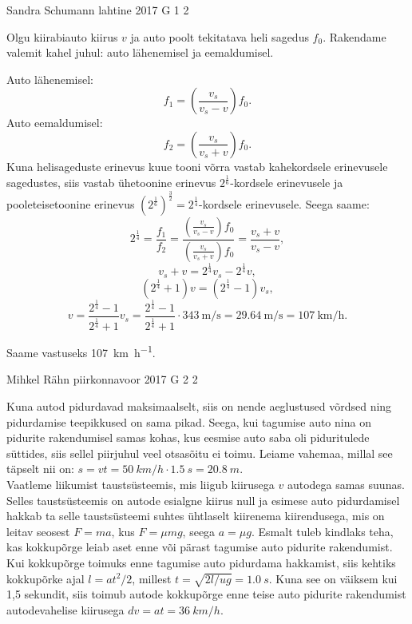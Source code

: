 \documentclass[11pt, twoside]{article}
\begin{document}
{%
{Sandra Schumann} %
{lahtine} %
{2017} %
{G 1} %
{2} %
{

\ifSolution
Olgu kiirabiauto kiirus $v$ ja auto poolt tekitatava heli sagedus $f_0$. Rakendame valemit kahel juhul: auto lähenemisel ja eemaldumisel.

Auto lähenemisel:
\[f_1 = \left(\frac{v_s}{v_s - v}\right)f_0.\]
Auto eemaldumisel:
\[f_2 = \left(\frac{v_s}{v_s + v}\right)f_0.\]
Kuna helisageduste erinevus kuue tooni võrra vastab kahekordsele erinevusele sagedustes, siis vastab ühetoonine erinevus $2^{\frac 1 6}$-kordsele erinevusele ja pooleteisetoonine erinevus $\left(2^{\frac 1 6}\right)^{\frac 3 2} = 2^{\frac 1 4}$-kordsele erinevusele. Seega saame:
\[2^{\frac 1 4} = \frac{f_1}{f_2} = \frac{(\frac{v_s}{v_s - v})f_0}{(\frac{v_s}{v_s + v})f_0} = \frac{v_s + v}{v_s - v},\]
\[v_s + v = 2^{\frac 1 4}v_s - 2^{\frac 1 4}v,\]
\[(2^{\frac 1 4} + 1)v = (2^{\frac 1 4} - 1)v_s,\]
\[v = \frac{2^{\frac 1 4} - 1}{2^{\frac 1 4} + 1}v_s = \frac{2^{\frac 1 4} - 1}{2^{\frac 1 4} + 1} \cdot \SI{343}{\meter\per\second} = \SI{29.64}{\meter\per\second} = \SI{107}{\kilo\meter\per\hour}. \]

Saame vastuseks \SI{107}{\kilo\meter\per\hour}.
\fi
}

{Mihkel Rähn} %
{piirkonnavoor} %
{2017} %
{G 2} %
{2} %
{

\ifSolution
\osa Kuna autod pidurdavad maksimaalselt, siis on nende aeglustused võrdsed ning pidurdamise teepikkused on sama pikad. Seega, kui tagumise auto nina on pidurite rakendumisel samas kohas, kus eesmise auto saba oli piduritulede süttides, siis sellel piirjuhul veel otsasõitu ei toimu. Leiame vahemaa, millal see täpselt nii on: $s=vt=\SI{50}{km/h}\cdot\SI{1,5}{s}=\SI{20,8}{m}$.\\
\osa Vaatleme liikumist taustsüsteemis, mis liigub kiirusega $v$ autodega samas suunas. Selles taustsüsteemis on autode esialgne kiirus null ja esimese auto pidurdamisel hakkab ta selle taustsüsteemi suhtes ühtlaselt kiirenema kiirendusega, mis on leitav seosest $F=ma$, kus $F=\mu mg$, seega $a=\mu g$. Esmalt tuleb kindlaks teha, kas kokkupõrge leiab aset enne või pärast tagumise auto pidurite rakendumist. Kui kokkupõrge toimuks enne tagumise auto pidurdama hakkamist, siis kehtiks kokkupõrke ajal $l=at^2/2$, millest $t=\sqrt{2l/ug}=\SI{1.0}{s}$. Kuna see on väiksem kui 1,5 sekundit, siis toimub autode kokkupõrge enne teise auto pidurite rakendumist autodevahelise kiirusega $dv=at=\SI{36}{km/h}$.
\fi
}

}
\end{document}
